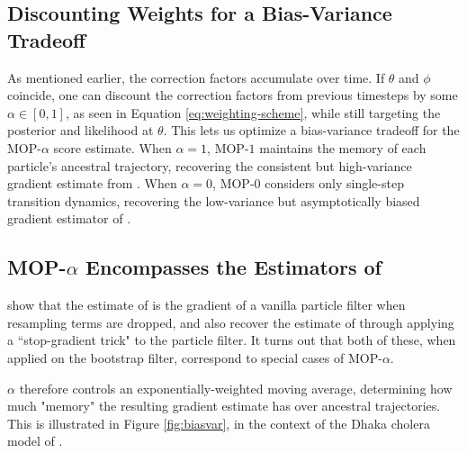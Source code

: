 \documentclass[9pt,twocolumn,twoside]{pnas-new}
\begin{document}
\subsection{Discounting Weights for a Bias-Variance Tradeoff}

As mentioned earlier, the correction factors accumulate over time. If $\theta$ and $\phi$ coincide, one can discount the correction factors from previous timesteps by some $\alpha \in [0,1]$, as seen in Equation \ref{eq:weighting-scheme}, while still targeting the posterior and likelihood at $\theta$. This lets us optimize a bias-variance tradeoff for the MOP-$\alpha$ score estimate. When $\alpha=1$, MOP-$1$ maintains the memory of each particle's ancestral trajectory, recovering the consistent but high-variance gradient estimate from \cite{poyiadjis11, scibior21}. When $\alpha=0$, MOP-$0$ considers only single-step transition dynamics, recovering the low-variance but asymptotically biased gradient estimator of \cite{blei2018vsmc}. 


\subsection{MOP-$\alpha$ Encompasses the Estimators of \cite{poyiadjis11, scibior21, blei2018vsmc}}

\cite{scibior21} show that the estimate of \cite{blei2018vsmc} is the gradient of a vanilla particle filter when resampling terms are dropped, and also recover the estimate of \cite{poyiadjis11} through applying a ``stop-gradient trick" to the particle filter. It turns out that both of these, when applied on the bootstrap filter, correspond to special cases of MOP-$\alpha$.


$\alpha$ therefore controls an exponentially-weighted moving average, determining how much "memory" the resulting gradient estimate has over ancestral trajectories. This is illustrated in Figure \ref{fig:biasvar}, in the context of the Dhaka cholera model of \cite{king08}. 
\end{document}
